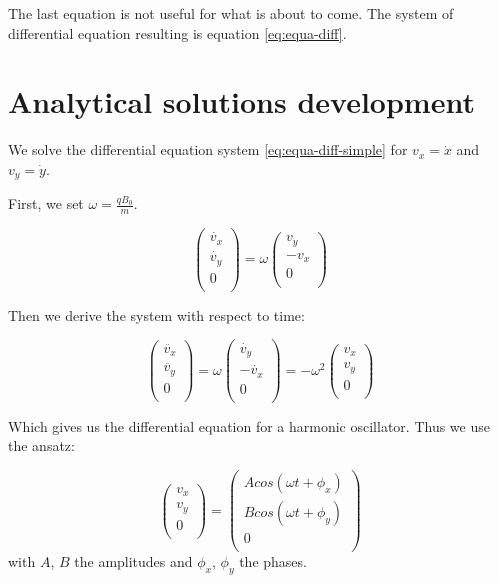 \documentclass[a4paper,12pt,twoside]{article}
\begin{document}
The last equation is not useful for what is about to come.
The system of differential equation resulting is equation \ref{eq:equa-diff}.

\section{Analytical solutions development} \label{ann:dev-sol-ana}
We solve the differential equation system \ref{eq:equa-diff-simple} for $v_x = \dot{x}$ and $v_y = \dot{y}$.

First, we set $\omega = \frac{qB_0}{m}$.

\begin{equation*}
	\begin{pmatrix} \dot{v_x}\\ \dot{v_y}\\ 0\\ \end{pmatrix} = \omega \begin{pmatrix} v_y\\ -v_x\\ 0\\ \end{pmatrix}
\end{equation*}

Then we derive the system with respect to time:

\begin{equation*}
	\begin{pmatrix} \ddot{v_x}\\ \ddot{v_y}\\ 0\\ \end{pmatrix} = \omega \begin{pmatrix} \dot{v_y}\\ -\dot{v_x}\\ 0\\ \end{pmatrix} = -\omega ^2 \begin{pmatrix} v_x\\ v_y\\ 0\\ \end{pmatrix}
\end{equation*}

Which gives us the differential equation for a harmonic oscillator. Thus we use the ansatz:

\begin{equation*}
	\begin{pmatrix} v_x\\ v_y\\ 0\\ \end{pmatrix} = \begin{pmatrix} Acos(\omega t + \phi_x)\\ Bcos(\omega t + \phi_y)\\ 0\\ \end{pmatrix}
\end{equation*}
with $A$, $B$ the amplitudes and $\phi_x$, $\phi_y$ the phases.
\end{document}
